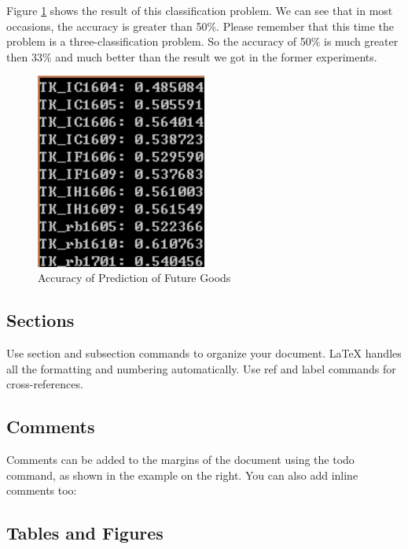 Figure \ref{fig:luowen2} shows the result of this classification problem. We can see that in most occasions, the accuracy is greater than 50\%. Please remember that this time the problem is a three-classification problem. So the accuracy of 50\% is much greater then 33\% and much better than the result we got in the former experiments.

\begin{figure}
\centering
\includegraphics[width=0.5\textwidth]{luowen2.png}
\caption{\label{fig:luowen2}Accuracy of Prediction of Future Goods}
\end{figure}

\subsection{Sections}

Use section and subsection commands to organize your document. \LaTeX{} handles all the formatting and numbering automatically. Use ref and label commands for cross-references.

\subsection{Comments}

Comments can be added to the margins of the document using the  todo command, as shown in the example on the right. You can also add inline comments too:


\subsection{Tables and Figures}

